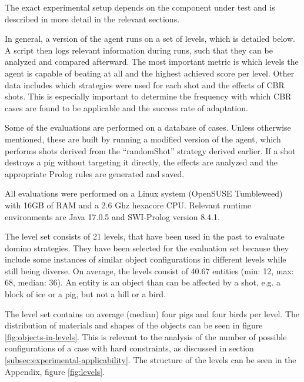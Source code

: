 The exact experimental setup depends on the component under test and is described in more detail in the relevant sections.

In general, a version of the agent runs on a set of levels, which is detailed below.
A script then logs relevant information during runs, such that they can be analyzed and compared afterward.
The most important metric is which levels the agent is capable of beating at all and the highest achieved score per level.
Other data includes which strategies were used for each shot and the effects of \ac{CBR} shots.
This is especially important to determine the frequency with which \acs{CBR} cases are found to be applicable and the success rate of adaptation.

Some of the evaluations are performed on a database of cases. Unless otherwise mentioned, these are built by running a modified version of the agent, which performs shots derived from the ``randomShot'' strategy derived earlier. If a shot destroys a pig without targeting it directly, the effects are analyzed and the appropriate Prolog rules are generated and saved.

All evaluations were performed on a Linux system (OpenSUSE Tumbleweed) with 16GB of RAM and a 2.6 Ghz hexacore CPU. Relevant runtime environments are Java 17.0.5 and SWI-Prolog version 8.4.1.

The level set consists of 21 levels, that have been used in the past to evaluate domino strategies. They have been selected for the evaluation set because they include some instances of similar object configurations in different levels while still being diverse.
On average, the levels consist of 40.67 entities (min: 12, max: 68, median: 36). An entity is an object than can be affected by a shot, e.g. a block of ice or a pig, but not a hill or a bird.

The level set contains on average (median) four pigs and four birds per level. 
The distribution of materials and shapes of the objects can be seen in figure \ref{fig:objects-in-levels}. 
This is relevant to the analysis of the number of possible configurations of a case with hard constraints, as discussed in section \ref{subsec:experimental-applicability}.
The structure of the levels can be seen in the Appendix, figure \ref{fig:levels}.

